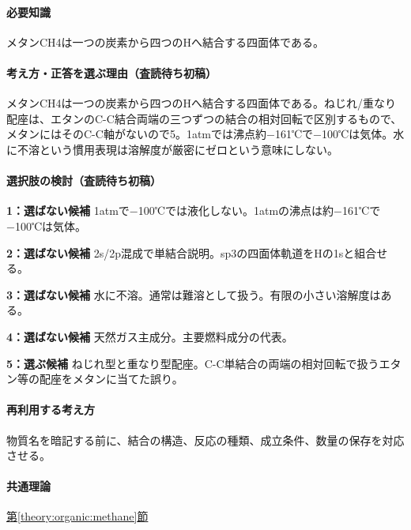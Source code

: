 \paragraph{必要知識} メタンCH4は一つの炭素から四つのHへ結合する四面体である。

\paragraph{考え方・正答を選ぶ理由（査読待ち初稿）} メタンCH4は一つの炭素から四つのHへ結合する四面体である。ねじれ/重なり配座は、エタンのC-C結合両端の三つずつの結合の相対回転で区別するもので、メタンにはそのC-C軸がないので5。1atmでは沸点約−161℃で−100℃は気体。水に不溶という慣用表現は溶解度が厳密にゼロという意味にしない。

\paragraph{選択肢の検討（査読待ち初稿）}\mbox{}\par

\noindent\textbf{1：選ばない候補} 1atmで−100℃では液化しない。1atmの沸点は約−161℃で−100℃は気体。\par

\noindent\textbf{2：選ばない候補} 2s/2p混成で単結合説明。sp3の四面体軌道をHの1sと組合せる。\par

\noindent\textbf{3：選ばない候補} 水に不溶。通常は難溶として扱う。有限の小さい溶解度はある。\par

\noindent\textbf{4：選ばない候補} 天然ガス主成分。主要燃料成分の代表。\par

\noindent\textbf{5：選ぶ候補} ねじれ型と重なり型配座。C-C単結合の両端の相対回転で扱うエタン等の配座をメタンに当てた誤り。\par

\paragraph{再利用する考え方} 物質名を暗記する前に、結合の構造、反応の種類、成立条件、数量の保存を対応させる。

\paragraph{共通理論} \hyperref[theory:organic:methane]{第\ref*{theory:organic:methane}節}

